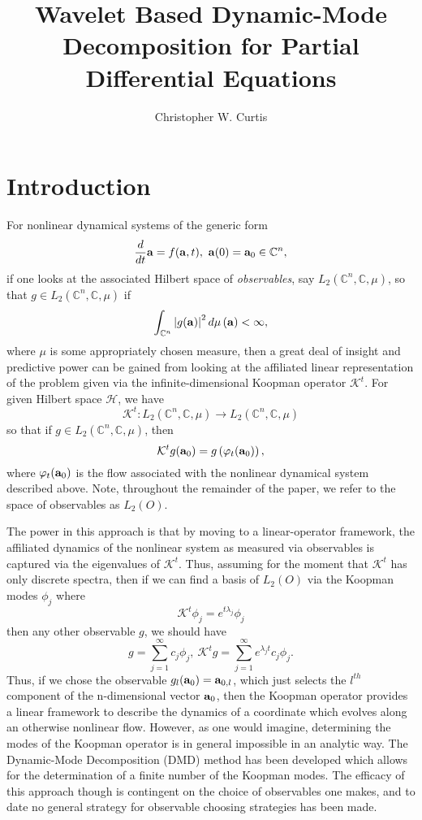 \documentclass[a4paper,11pt]{article}
\title{Wavelet Based Dynamic-Mode Decomposition for Partial Differential Equations}
\author{Christopher W. Curtis}
\date{}
\begin{document}
\maketitle
\section*{Introduction}
For nonlinear dynamical systems of the generic form
\[
\frac{d}{dt}{\bf a} = f({\bf a},t), ~ {\bf a}(0) = {\bf a}_{0} \in \mathbb{C}^{n},
\]
if one looks at the associated Hilbert space of {\it observables}, say $L_{2}\left(\mathbb{C}^{n},\mathbb{C},\mu\right)$, so that $g \in L_{2}\left( \mathbb{C}^{n},\mathbb{C},\mu\right)$ if
\[
\int_{\mathbb{C}^{n}} \left|g({\bf a})\right|^{2} d\mu\left({\bf a}\right) < \infty,
\]
where $\mu$ is some appropriately chosen measure, then a great deal of insight and predictive power can be gained from looking at the affiliated linear representation of the problem given via the infinite-dimensional Koopman operator $\mathcal{K}^{t}$.  For given Hilbert space $\mathcal{H}$, we have 
\[
\mathcal{K}^{t}:L_{2}\left( \mathbb{C}^{n},\mathbb{C},\mu\right)\rightarrow L_{2}\left( \mathbb{C}^{n},\mathbb{C},\mu\right) 
\]
so that if $g \in L_{2}\left( \mathbb{C}^{n},\mathbb{C},\mu\right)$, then 
\[
\mathcal{K}^{t}g({\bf a}_{0}) =  g\left(\varphi_{t}({\bf a}_{0})\right), 
\]
where $\varphi_{t}({\bf a}_{0})$ is the flow associated with the nonlinear dynamical system described above.  Note, throughout the remainder of the paper, we refer to the space of observables as $L_{2}\left(O \right)$.

The power in this approach is that by moving to a linear-operator framework, the affiliated dynamics of the nonlinear system as measured via observables is captured via the eigenvalues of $\mathcal{K}^{t}$.  Thus, assuming for the moment that $\mathcal{K}^{t}$ has only discrete spectra, then if we can find a basis of $L_{2}\left(O\right)$ via the Koopman modes $\phi_{j}$ where
\[
\mathcal{K}^{t}\phi_{j} = e^{t\lambda_{j}}\phi_{j}
\]
then any other observable $g$, we should have 
\[
g = \sum_{j=1}^{\infty}c_{j}\phi_{j}, ~ \mathcal{K}^{t}g = \sum_{j=1}^{\infty}e^{\lambda_{j}t}c_{j}\phi_{j}.
\]
Thus, if we chose the observable $g_{l}({\bf a}_{0}) = {\bf a}_{0,l}$, which just selects the $l^{th}$ component of the n-dimensional vector ${\bf a}_{0}$, then the Koopman operator provides a linear framework to describe the dynamics of a coordinate which evolves along an otherwise nonlinear flow.  However, as one would imagine, determining the modes of the Koopman operator is in general impossible in an analytic way.  The Dynamic-Mode Decomposition (DMD) method \cite{schmid,mezic1,williams,kutz} has been developed which allows for the determination of a finite number of the Koopman modes.  The efficacy of this approach though is contingent on the choice of observables one makes, and to date no general strategy for observable choosing strategies has been made.  
\end{document}

